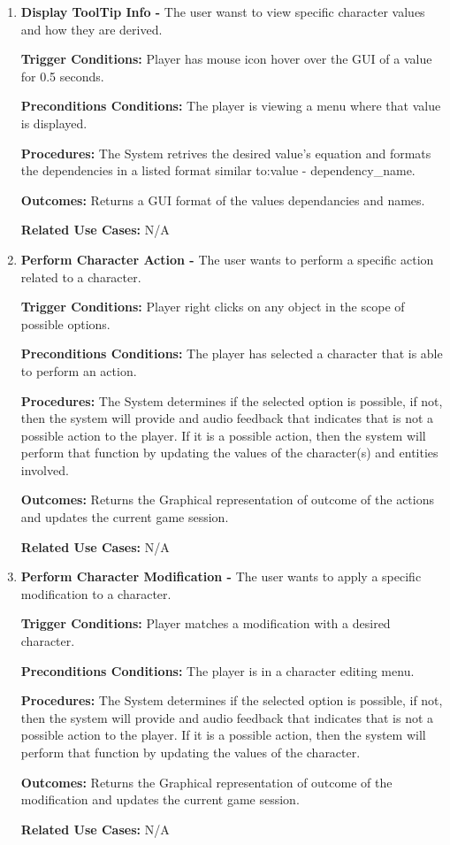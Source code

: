 \documentclass{article}
\begin{document}
\begin{enumerate}[{PUC}1. ]
	\item \textbf{Display ToolTip Info -} The user wanst to view specific character values and how they are derived.\par
\textbf{Trigger Conditions: }Player has mouse icon hover over the GUI of a value for 0.5 seconds. \par
\textbf{Preconditions Conditions: }The player is viewing a menu where that value is displayed. \par
\textbf{Procedures: }The System retrives the desired value's equation and formats the dependencies in a listed format similar to:\newline value - dependency\_name. \par
\textbf{Outcomes: }Returns a GUI format of the values dependancies and names. \par
\textbf{Related Use Cases: }N/A \par

	\item \textbf{Perform Character Action -} The user wants to perform a specific action related to a character.\par
\textbf{Trigger Conditions: }Player right clicks on any object in the scope of possible options. \par
\textbf{Preconditions Conditions: }The player has selected a character that is able to perform an action. \par
\textbf{Procedures: }The System determines if the selected option is possible, if not, then the system will provide and audio feedback that indicates that is not a possible action to the player. If it is a possible action, then the system will perform that function by updating the values of the character(s) and entities involved. \par
\textbf{Outcomes: }Returns the Graphical representation of outcome of the actions and updates the current game session. \par
\textbf{Related Use Cases: }N/A \par

	\item \textbf{Perform Character Modification -} The user wants to apply a specific modification to a character.\par
\textbf{Trigger Conditions: }Player matches a modification with a desired character. \par
\textbf{Preconditions Conditions: }The player is in a character editing menu. \par
\textbf{Procedures: }The System determines if the selected option is possible, if not, then the system will provide and audio feedback that indicates that is not a possible action to the player. If it is a possible action, then the system will perform that function by updating the values of the character. \par
\textbf{Outcomes: }Returns the Graphical representation of outcome of the modification and updates the current game session. \par
\textbf{Related Use Cases: }N/A \par


\end{enumerate}
\end{document}
